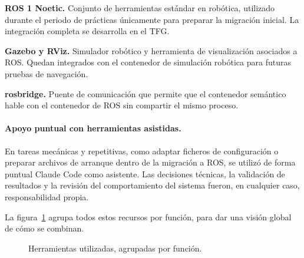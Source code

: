 \documentclass[11pt,fleqn,openany]{book} %
\begin{document}
\textbf{ROS 1 Noetic.} Conjunto de herramientas estándar en robótica, utilizado durante el periodo de prácticas únicamente para preparar la migración inicial. La integración completa se desarrolla en el TFG.

\textbf{Gazebo y RViz.} Simulador robótico y herramienta de visualización asociados a ROS. Quedan integrados con el contenedor de simulación robótica para futuras pruebas de navegación.

\textbf{rosbridge.} Puente de comunicación que permite que el contenedor semántico hable con el contenedor de ROS sin compartir el mismo proceso.

\paragraph{Apoyo puntual con herramientas asistidas.} En tareas mecánicas y repetitivas, como adaptar ficheros de configuración o preparar archivos de arranque dentro de la migración a ROS, se utilizó de forma puntual Claude Code como asistente. Las decisiones técnicas, la validación de resultados y la revisión del comportamiento del sistema fueron, en cualquier caso, responsabilidad propia.

La figura~\ref{fig:herramientas} agrupa todos estos recursos por función, para dar una visión global de cómo se combinan.

\begin{figure}[h]
\centering
{}
\caption[Herramientas utilizadas durante las prácticas.]{Herramientas utilizadas, agrupadas por función.}
\label{fig:herramientas}
\end{figure}
\end{document}
